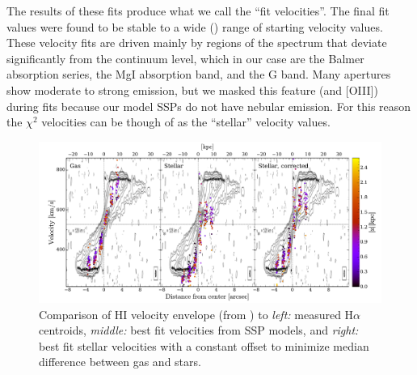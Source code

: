 
The results of these fits produce what we call the ``fit
velocities''. The final fit values were found to be stable to a wide
() range of starting velocity values. These
velocity fits are driven mainly by regions of the spectrum that
deviate significantly from the continuum level, which in our case are
the Balmer absorption series, the MgI absorption band, and the G
band. Many apertures show moderate to strong \Ha emission, but we
masked this feature (and [OIII]) during fits because our model SSPs do
not have nebular emission. For this reason the $\chi^2$ velocities can
be though of as the ``stellar'' velocity values.



\begin{figure}[t]
  \centering
  \includegraphics[width=\textwidth]{891_2/figs/Swat_vel.pdf}
  \caption[Comparison of measure stellar and gas velocities to HI
    velocity data]{\fixspacing\label{891_2:fig:Swat_vel}Comparison of
    HI velocity envelope (from \citet{Swaters97}) to \emph{left:}
    measured H$\alpha$ centroids, \emph{middle:} best fit velocities
    from SSP models, and \emph{right:} best fit stellar velocities
    with a constant offset to minimize median difference between gas
    and stars.}
\end{figure}

